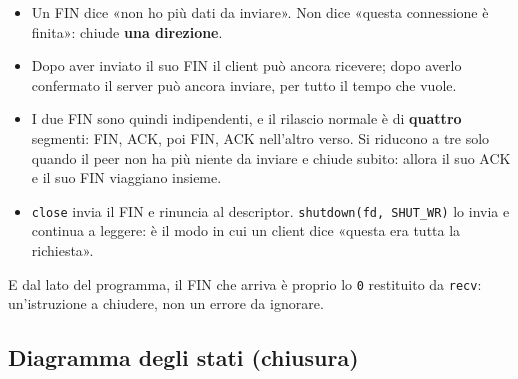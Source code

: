 \begin{itemize}
    \item Un FIN dice «non ho più dati da inviare». Non dice «questa connessione è finita»: chiude \textbf{una direzione}.
    \item Dopo aver inviato il suo FIN il client può ancora ricevere; dopo averlo confermato il server può ancora inviare,
          per tutto il tempo che vuole.
    \item I due FIN sono quindi indipendenti, e il rilascio normale è di \textbf{quattro} segmenti: FIN, ACK, poi FIN, ACK
          nell'altro verso. Si riducono a tre solo quando il peer non ha più niente da inviare e chiude subito: allora il suo
          ACK e il suo FIN viaggiano insieme.
    \item \texttt{close} invia il FIN e rinuncia al descriptor. \texttt{shutdown(fd, SHUT\_WR)} lo invia e continua a
          leggere: è il modo in cui un client dice «questa era tutta la richiesta».
\end{itemize}

E dal lato del programma, il FIN che arriva è proprio lo \texttt{0} restituito da \texttt{recv}: un'istruzione a
chiudere, non un errore da ignorare.

\subsection{Diagramma degli stati (chiusura)}

